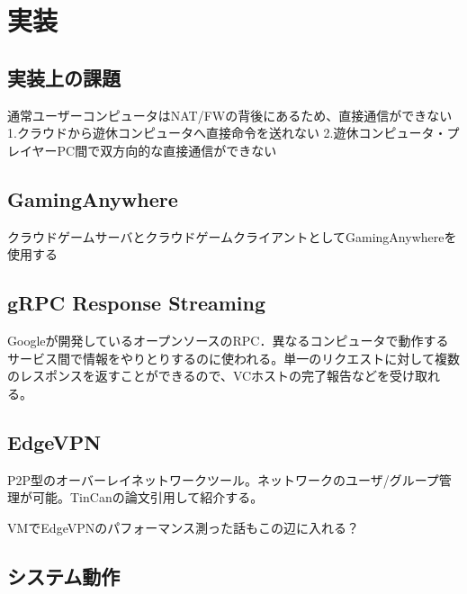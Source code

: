 \section{実装}

\subsection{実装上の課題}
通常ユーザーコンピュータはNAT/FWの背後にあるため、直接通信ができない
1.クラウドから遊休コンピュータへ直接命令を送れない
2.遊休コンピュータ・プレイヤーPC間で双方向的な直接通信ができない

\subsection{GamingAnywhere}
クラウドゲームサーバとクラウドゲームクライアントとしてGamingAnywhereを使用する

\subsection{gRPC Response Streaming}
Googleが開発しているオープンソースのRPC．異なるコンピュータで動作するサービス間で情報をやりとりするのに使われる。単一のリクエストに対して複数のレスポンスを返すことができるので、VCホストの完了報告などを受け取れる。

\subsection{EdgeVPN}
P2P型のオーバーレイネットワークツール。ネットワークのユーザ/グループ管理が可能。TinCanの論文引用して紹介する。

VMでEdgeVPNのパフォーマンス測った話もこの辺に入れる？

\subsection{システム動作}


